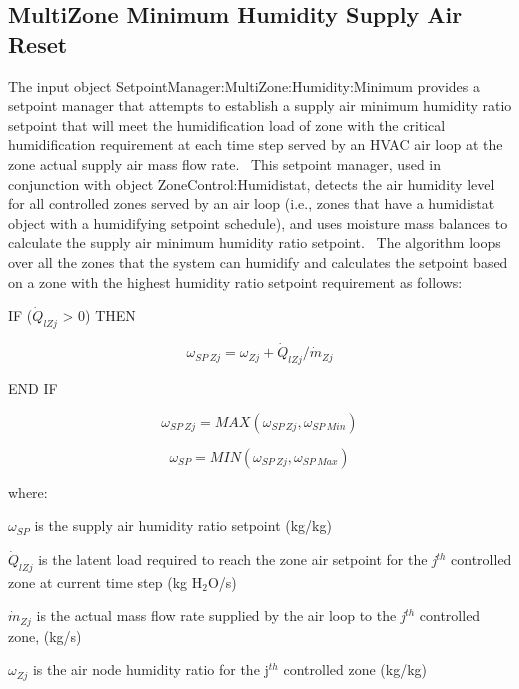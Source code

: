 \subsection{MultiZone Minimum Humidity Supply Air Reset}\label{multizone-minimum-humidity-supply-air-reset}

The input object SetpointManager:MultiZone:Humidity:Minimum provides a setpoint manager that attempts to establish a supply air minimum humidity ratio setpoint that will meet the humidification load of zone with the critical humidification requirement at each time step served by an HVAC air loop at the zone actual supply air mass flow rate.~ This setpoint manager, used in conjunction with object ZoneControl:Humidistat, detects the air humidity level for all controlled zones served by an air loop (i.e., zones that have a humidistat object with a humidifying setpoint schedule), and uses moisture mass balances to calculate the supply air minimum humidity ratio setpoint.~ The algorithm loops over all the zones that the system can humidify and calculates the setpoint based on a zone with the highest humidity ratio setpoint requirement as follows:

IF (\({\dot Q_{lZj}}\) \textgreater{} 0) THEN

\begin{equation}
{\omega_{SP~Zj}} = {\omega_{Zj}} + {{{\dot Q}_{lZj}} / {{\dot m}_{Zj}}}
\end{equation}

END IF

\begin{equation}
{\omega_{SP~Zj}} = MAX\left( {{\omega_{SP~Zj}},{\omega_{SP~Min}}} \right)
\end{equation}

\begin{equation}
{\omega_{SP}} = MIN\left( {{\omega_{SP~Zj}},{\omega_{SP~Max}}} \right)
\end{equation}

where:

\({\omega_{SP}}\) is the supply air humidity ratio setpoint (kg/kg)

\({\dot Q_{lZj}}\) is the latent load required to reach the zone air setpoint for the \emph{j}\(^{th}\) controlled zone at current time step (kg H\(_{2}\)O/s)

\({\dot m_{Zj}}\) is the actual mass flow rate supplied by the air loop to the \emph{j}\(^{th}\) controlled zone, (kg/s)

\({\omega_{Zj}}\) is the air node humidity ratio for the j\(^{th}\) controlled zone (kg/kg)

